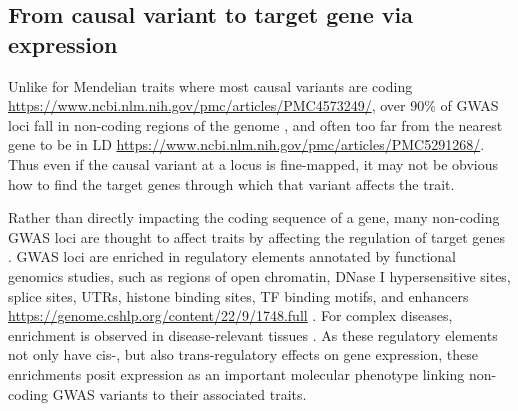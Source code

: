 \begin{outline}
\subsection{From causal variant to target gene via expression}

\1 Unlike for Mendelian traits where most causal variants are coding \url{https://www.ncbi.nlm.nih.gov/pmc/articles/PMC4573249/}, 
over 90\% of \gls{GWAS} loci fall in non-coding regions of the genome \autocite{gallagher2018PostGWASEraAssociation},
and often too far from the nearest gene to be in \gls{LD} \url{https://www.ncbi.nlm.nih.gov/pmc/articles/PMC5291268/}.
Thus even if the causal variant at a locus is fine-mapped, 
it may not be obvious how to find the target genes through which that variant affects the trait.
%

\1 Rather than directly impacting the coding sequence of a gene, 
many non-coding GWAS loci are thought to affect traits by affecting the regulation of target genes \autocite{gallagher2018PostGWASEraAssociation}.
\gls{GWAS} loci are enriched in regulatory elements annotated by functional genomics studies, such as
    regions of open chromatin, 
    DNase I hypersensitive sites,
    splice sites, UTRs,
    histone binding sites, 
    \gls{TF} binding motifs,
    and enhancers \url{https://genome.cshlp.org/content/22/9/1748.full} \autocite{trynka2015DisentanglingEffectsColocalizing,gallagher2018PostGWASEraAssociation}.
For complex diseases, enrichment is observed in disease-relevant tissues \autocite{visscher201710YearsGWAS}.
As these regulatory elements not only have cis-, but also trans-regulatory effects on gene expression,
these enrichments posit expression as an important molecular phenotype linking non-coding \gls{GWAS} variants to their associated traits.


\end{outline}
